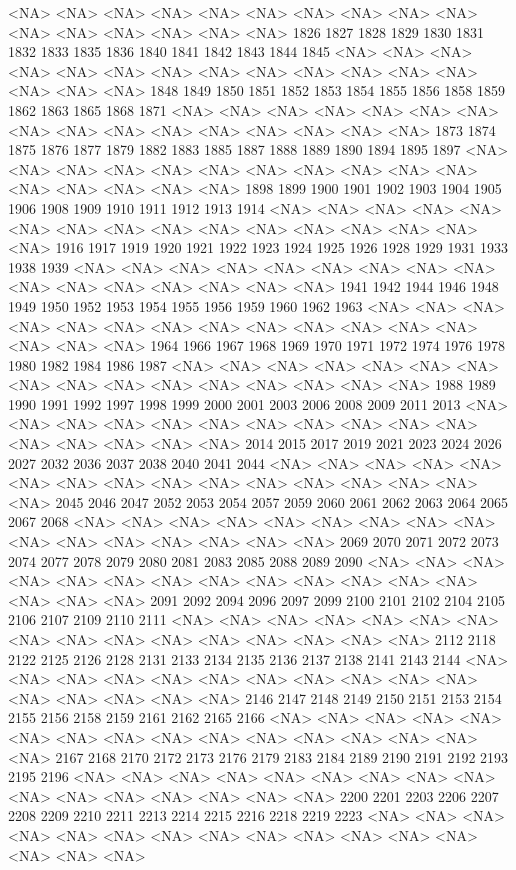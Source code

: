 \documentclass{article}
\begin{document}
\begin{Schunk}
\begin{Soutput}
<NA> <NA> <NA> <NA> <NA> <NA> <NA> <NA> <NA> <NA> <NA> <NA> <NA> <NA> <NA> <NA> 
1826 1827 1828 1829 1830 1831 1832 1833 1835 1836 1840 1841 1842 1843 1844 1845 
<NA> <NA> <NA> <NA> <NA> <NA> <NA> <NA> <NA> <NA> <NA> <NA> <NA> <NA> <NA> <NA> 
1848 1849 1850 1851 1852 1853 1854 1855 1856 1858 1859 1862 1863 1865 1868 1871 
<NA> <NA> <NA> <NA> <NA> <NA> <NA> <NA> <NA> <NA> <NA> <NA> <NA> <NA> <NA> <NA> 
1873 1874 1875 1876 1877 1879 1882 1883 1885 1887 1888 1889 1890 1894 1895 1897 
<NA> <NA> <NA> <NA> <NA> <NA> <NA> <NA> <NA> <NA> <NA> <NA> <NA> <NA> <NA> <NA> 
1898 1899 1900 1901 1902 1903 1904 1905 1906 1908 1909 1910 1911 1912 1913 1914 
<NA> <NA> <NA> <NA> <NA> <NA> <NA> <NA> <NA> <NA> <NA> <NA> <NA> <NA> <NA> <NA> 
1916 1917 1919 1920 1921 1922 1923 1924 1925 1926 1928 1929 1931 1933 1938 1939 
<NA> <NA> <NA> <NA> <NA> <NA> <NA> <NA> <NA> <NA> <NA> <NA> <NA> <NA> <NA> <NA> 
1941 1942 1944 1946 1948 1949 1950 1952 1953 1954 1955 1956 1959 1960 1962 1963 
<NA> <NA> <NA> <NA> <NA> <NA> <NA> <NA> <NA> <NA> <NA> <NA> <NA> <NA> <NA> <NA> 
1964 1966 1967 1968 1969 1970 1971 1972 1974 1976 1978 1980 1982 1984 1986 1987 
<NA> <NA> <NA> <NA> <NA> <NA> <NA> <NA> <NA> <NA> <NA> <NA> <NA> <NA> <NA> <NA> 
1988 1989 1990 1991 1992 1997 1998 1999 2000 2001 2003 2006 2008 2009 2011 2013 
<NA> <NA> <NA> <NA> <NA> <NA> <NA> <NA> <NA> <NA> <NA> <NA> <NA> <NA> <NA> <NA> 
2014 2015 2017 2019 2021 2023 2024 2026 2027 2032 2036 2037 2038 2040 2041 2044 
<NA> <NA> <NA> <NA> <NA> <NA> <NA> <NA> <NA> <NA> <NA> <NA> <NA> <NA> <NA> <NA> 
2045 2046 2047 2052 2053 2054 2057 2059 2060 2061 2062 2063 2064 2065 2067 2068 
<NA> <NA> <NA> <NA> <NA> <NA> <NA> <NA> <NA> <NA> <NA> <NA> <NA> <NA> <NA> <NA> 
2069 2070 2071 2072 2073 2074 2077 2078 2079 2080 2081 2083 2085 2088 2089 2090 
<NA> <NA> <NA> <NA> <NA> <NA> <NA> <NA> <NA> <NA> <NA> <NA> <NA> <NA> <NA> <NA> 
2091 2092 2094 2096 2097 2099 2100 2101 2102 2104 2105 2106 2107 2109 2110 2111 
<NA> <NA> <NA> <NA> <NA> <NA> <NA> <NA> <NA> <NA> <NA> <NA> <NA> <NA> <NA> <NA> 
2112 2118 2122 2125 2126 2128 2131 2133 2134 2135 2136 2137 2138 2141 2143 2144 
<NA> <NA> <NA> <NA> <NA> <NA> <NA> <NA> <NA> <NA> <NA> <NA> <NA> <NA> <NA> <NA> 
2146 2147 2148 2149 2150 2151 2153 2154 2155 2156 2158 2159 2161 2162 2165 2166 
<NA> <NA> <NA> <NA> <NA> <NA> <NA> <NA> <NA> <NA> <NA> <NA> <NA> <NA> <NA> <NA> 
2167 2168 2170 2172 2173 2176 2179 2183 2184 2189 2190 2191 2192 2193 2195 2196 
<NA> <NA> <NA> <NA> <NA> <NA> <NA> <NA> <NA> <NA> <NA> <NA> <NA> <NA> <NA> <NA> 
2200 2201 2203 2206 2207 2208 2209 2210 2211 2213 2214 2215 2216 2218 2219 2223 
<NA> <NA> <NA> <NA> <NA> <NA> <NA> <NA> <NA> <NA> <NA> <NA> <NA> <NA> <NA> <NA> 

\end{Soutput}
\end{Schunk}
\end{document}
